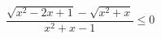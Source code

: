 \begin{ex}[type=inequality]
	\begin{condition}
		\( \dfrac{\sqrt{x^2-2x+1}-\sqrt{x^2+x}}{x^2+x-1}\le0 \)
	\end{condition}
	\answer{\( \left( \dfrac{-1-\sqrt{5}}{2};-1 \right]\cup\left[ 0;\dfrac{1}{3} \right]\cup\left( \dfrac{\sqrt{5}-1}{x};+\infty \right) \)}
\end{ex}